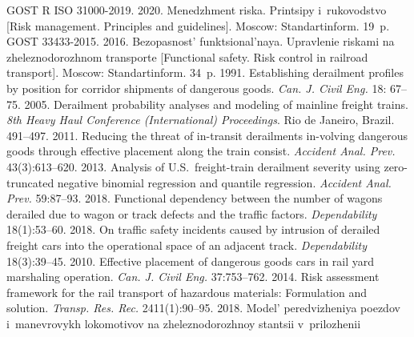 \begin{multicols}{2}
{\small\frenchspacing
 {%
 \begin{thebibliography}{99} 
 GOST R ISO 31000-2019. 2020. Menedzhment riska. Printsipy i~rukovodstvo [Risk 
management. Principles and guidelines]. Moscow: Standartinform. 19~p.
GOST 33433-2015. 2016. Bezopasnost' funktsional'naya. Upravlenie riskami na 
zheleznodorozhnom transporte [Functional safety. Risk control in railroad transport]. 
Moscow: Standartinform. 34~p. 
 1991. Establishing derailment profiles by 
position for corridor shipments of dangerous goods. \textit{Can. J. Civil 
Eng.} 18: 67--75.
 2005. Derailment probability analyses 
and modeling of mainline freight trains. \textit{8th Heavy Haul Conference 
(International) Proceedings}. Rio de Janeiro, Brazil. 491--497.
 2011. Reducing the threat 
of in-transit derailments in-volving dangerous goods through effective placement along 
the train consist. \textit{Accident Anal. Prev.} 43(3):613--620.
 2013. Analysis of U.S.\ 
freight-train derailment severity using zero-truncated negative binomial regression and 
quantile regression. \textit{Accident Anal. Prev.} 59:87--93.
2018. Functional dependency between the number of wagons derailed due to wagon or 
track defects and the traffic factors. \textit{Dependability} 18(1):53--60.
\bibitem{8-bos-1}
2018. On traffic safety incidents caused by intrusion of derailed freight cars into the 
operational space of an adjacent track. \textit{Dependability} 18(3):39--45.
\bibitem{9-bos-1}
 2010. Effective placement of dangerous 
goods cars in rail yard marshaling operation. \textit{Can. J. Civil Eng.} 
37:753--762.
 2014. Risk assessment framework for the rail 
transport of hazardous materials: Formulation and solution. \textit{Transp. 
Res. Rec.} 2411(1):90--95.
 2018. Mo\-del' pe\-re\-dvi\-zhe\-niya 
po\-ez\-dov i~ma\-nev\-ro\-vykh lo\-ko\-mo\-ti\-vov na zhe\-lez\-no\-do\-rozh\-noy stan\-tsii v~pri\-lo\-zhe\-nii 

\end{thebibliography}}}
\end{multicols}
